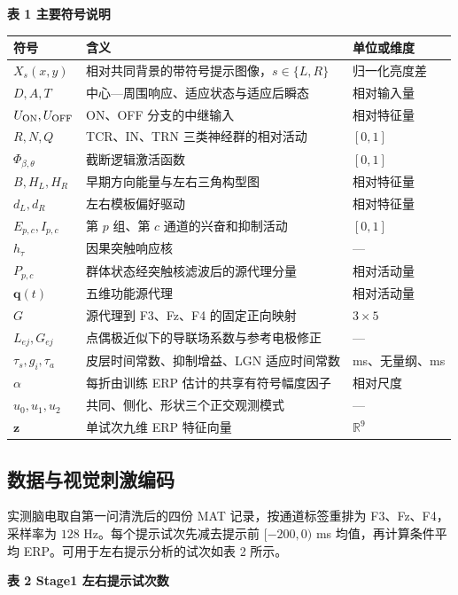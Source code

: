 \textbf{表 1 主要符号说明}

\begin{longtable}[]{@{}lll@{}}
\toprule
符号 & 含义 & 单位或维度 \\
\midrule
\endhead
\(X_s(x,y)\) & 相对共同背景的带符号提示图像，\(s\in\{L,R\}\) & 归一化亮度差 \\
\(D,A,T\) & 中心—周围响应、适应状态与适应后瞬态 & 相对输入量 \\
\(U_{\rm ON},U_{\rm OFF}\) & ON、OFF 分支的中继输入 & 相对特征量 \\
\(R,N,Q\) & TCR、IN、TRN 三类神经群的相对活动 & \([0,1]\) \\
\(\Phi_{\beta,\theta}\) & 截断逻辑激活函数 & \([0,1]\) \\
\(B,H_L,H_R\) & 早期方向能量与左右三角构型图 & 相对特征量 \\
\(d_L,d_R\) & 左右模板偏好驱动 & 相对特征量 \\
\(E_{p,c},I_{p,c}\) & 第 \(p\) 组、第 \(c\) 通道的兴奋和抑制活动 & \([0,1]\) \\
\(h_\tau\) & 因果突触响应核 & --- \\
\(P_{p,c}\) & 群体状态经突触核滤波后的源代理分量 & 相对活动量 \\
\(\mathbf q(t)\) & 五维功能源代理 & 相对活动量 \\
\(G\) & 源代理到 F3、Fz、F4 的固定正向映射 & \(3\times5\) \\
\(L_{ej},G_{ej}\) & 点偶极近似下的导联场系数与参考电极修正 & --- \\
\(\tau_s,g_i,\tau_a\) & 皮层时间常数、抑制增益、LGN 适应时间常数 & ms、无量纲、ms \\
\(\alpha\) & 每折由训练 ERP 估计的共享有符号幅度因子 & 相对尺度 \\
\(u_0,u_1,u_2\) & 共同、侧化、形状三个正交观测模式 & --- \\
\(\mathbf z\) & 单试次九维 ERP 特征向量 & \(\mathbb R^9\) \\
\bottomrule
\end{longtable}

\subsection{数据与视觉刺激编码}

实测脑电取自第一问清洗后的四份 MAT 记录，按通道标签重排为 F3、Fz、F4，采样率为 \(128\) Hz。每个提示试次先减去提示前 \([-200,0)\) ms 均值，再计算条件平均 ERP。可用于左右提示分析的试次如表 2 所示。

\textbf{表 2 Stage1 左右提示试次数}

